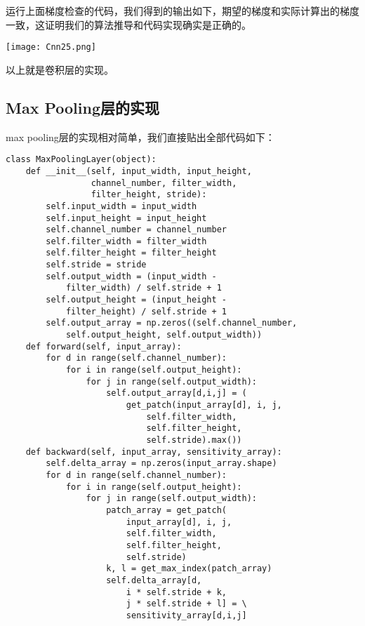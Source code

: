 运行上面梯度检查的代码，我们得到的输出如下，期望的梯度和实际计算出的梯度一致，这证明我们的算法推导和代码实现确实是正确的。

\texttt{[image: Cnn25.png]}

以上就是卷积层的实现。

\subsection{Max Pooling层的实现}\label{Cnn:12}

max pooling层的实现相对简单，我们直接贴出全部代码如下：
\begin{lstlisting}
class MaxPoolingLayer(object):
    def __init__(self, input_width, input_height, 
                 channel_number, filter_width, 
                 filter_height, stride):
        self.input_width = input_width
        self.input_height = input_height
        self.channel_number = channel_number
        self.filter_width = filter_width
        self.filter_height = filter_height
        self.stride = stride
        self.output_width = (input_width - 
            filter_width) / self.stride + 1
        self.output_height = (input_height -
            filter_height) / self.stride + 1
        self.output_array = np.zeros((self.channel_number,
            self.output_height, self.output_width))
    def forward(self, input_array):
        for d in range(self.channel_number):
            for i in range(self.output_height):
                for j in range(self.output_width):
                    self.output_array[d,i,j] = (    
                        get_patch(input_array[d], i, j,
                            self.filter_width, 
                            self.filter_height, 
                            self.stride).max())
    def backward(self, input_array, sensitivity_array):
        self.delta_array = np.zeros(input_array.shape)
        for d in range(self.channel_number):
            for i in range(self.output_height):
                for j in range(self.output_width):
                    patch_array = get_patch(
                        input_array[d], i, j,
                        self.filter_width, 
                        self.filter_height, 
                        self.stride)
                    k, l = get_max_index(patch_array)
                    self.delta_array[d, 
                        i * self.stride + k, 
                        j * self.stride + l] = \
                        sensitivity_array[d,i,j]
\end{lstlisting}

